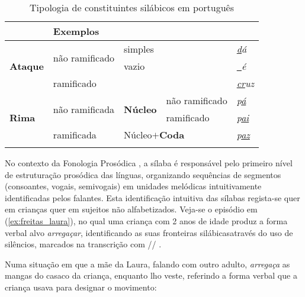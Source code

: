 \documentclass[output=paper]{LSP/langsci}
\begin{document}
\begin{table}
\begin{tabular}{lllll}
\lsptoprule
\multicolumn{4}{l}{Constituintes Silábicos}                                                          & Exemplos \\
\midrule
\multirow{3}{*}{\textbf{Ataque}} & \multirow{2}{*}{não ramificado} & \multicolumn{2}{l}{simples}              & \textit{\underline{d}á}       \\
                        &                                 & \multicolumn{2}{l}{vazio}                & \textit{\underline{~}é}       \\
                        & \multicolumn{3}{l}{ramificado}                                             & \textit{\underline{cr}uz}     \\
\multirow{3}{*}{\textbf{Rima}}   & \multirow{2}{*}{não ramificada} & \multirow{2}{*}{\textbf{Núcleo}} & não ramificado & \textit{p\underline{á}}       \\
                        &                                 &                         & ramificado     & \textit{p\underline{ai}}      \\
                        & ramificada                      & \multicolumn{2}{l}{Núcleo$+$\textbf{Coda}}          & \textit{p\underline{az}}     \\
\lspbottomrule
  \end{tabular}
  \caption{Tipologia de constituintes silábicos em português}
  \label{tab:freitas_tipologia}
\end{table}

No contexto da Fonologia Prosódica \citep{nesporvogel1986}, a sílaba é responsável pelo primeiro nível de estruturação prosódica das línguas, organizando sequências de segmentos (consoantes, vogais, semivogais) em unidades melódicas intuitivamente identificadas pelos falantes. Esta identificação intuitiva das sílabas regista-se quer em crianças quer em sujeitos não alfabetizados. Veja-se o episódio em (\ref{ex:freitas_laura}), no qual uma criança com 2 anos de idade produz a forma verbal alvo \textit{arregaçar}, identificando as suas fronteiras silábicas\largerpage[2] através do uso de silêncios, marcados na transcrição com // \citep{freitas1997,freitas_etal2007}.

Numa situação em que a mãe da Laura, falando com outro adulto, \textit{arregaça} as mangas do casaco da criança, enquanto lho veste, referindo a forma verbal que a criança usava para designar o movimento:
\end{document}
